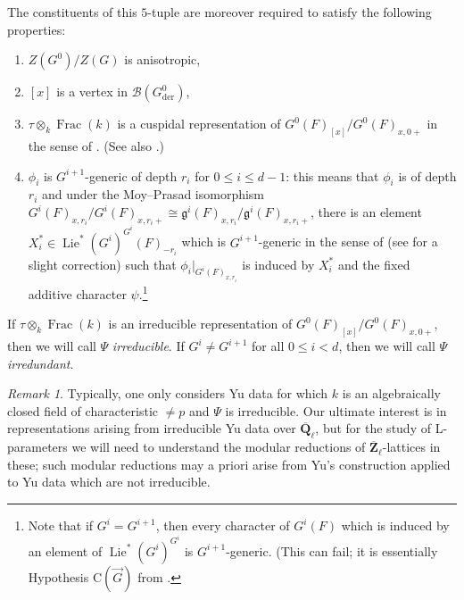 \documentclass[reqno]{amsart}
\numberwithin{equation}{subsection}
\newcommand{\F}{\mathbf{F}}
\newcommand{\Q}{\mathbf{Q}}
\newcommand{\Z}{\mathbf{Z}}
\newcommand{\ol}[1]{\overline{#1}}
\newcommand\cB{\mathcal{B}}
\newcommand\frg{\mathfrak{g}}
\DeclareMathOperator{\Lie}{Lie}
\DeclareMathOperator{\Frac}{Frac}
\DeclareMathOperator{\der}{der}
\theoremstyle{remark}
\newtheorem{remark}[thm]{Remark}
\numberwithin{equation}{subsection}
\numberwithin{figure}{subsection}
\begin{document}
The constituents of this $5$-tuple are moreover required to satisfy the following properties:
\begin{enumerate}
\item $Z(G^0)/Z(G)$ is anisotropic,
\item $[x]$ is a vertex in $\cB(G^0_{\der})$,
\item $\tau \otimes_k {\Frac(k)}$ is a cuspidal representation of $G^0(F)_{[x]}/G^0(F)_{x, 0+}$ in the sense of \cite[\S 2.10]{Cot26b}. (See also \cite[Proposition~2.1.4]{Cot26b}.)
\item $\phi_i$ is $G^{i+1}$-generic of depth $r_i$ for $0 \leq i \leq d-1$: this means that $\phi_i$ is of depth $r_i$ and under the Moy--Prasad isomorphism $G^i(F)_{x,r_i}/G^i(F)_{x,r_i+} \cong \frg^i(F)_{x,r_i}/\frg^i(F)_{x,r_i+}$, there is an element $X_i^* \in \Lie^*(G^i)^{G^i}(F)_{-r_i}$ which is $G^{i+1}$-generic in the sense of \cite[\S 8]{Yu01} (see \cite[Remark 4.1.3]{FKS23} for a slight correction) such that $\phi_i|_{G^i(F)_{x,r_i}}$ is induced by $X_i^*$ and the fixed additive character $\psi$.\footnote{Note that if $G^i = G^{i+1}$, then every character of $G^i(F)$ which is induced by an element of $\Lie^*(G^i)^{G^i}$ is $G^{i+1}$-generic. (This can fail; it is essentially Hypothesis $\mathrm{C}(\vec G)$ from \cite[\S 2.6]{HM08}.}
\end{enumerate}
If $\tau \otimes_k \Frac(k)$ is an irreducible representation of $G^0(F)_{[x]}/G^0(F)_{x,0+}$, then we will call $\Psi$ \textit{irreducible}. If $G^i \neq G^{i+1}$ for all $0\leq i<d$, then we will call $\Psi$ \textit{irredundant}.

\begin{remark}
Typically, one only considers Yu data for which $k$ is an algebraically closed field of characteristic $\neq p$ and $\Psi$ is irreducible. Our ultimate interest is in representations arising from irreducible Yu data over $\ol\Q_\ell$, but for the study of L-parameters we will need to understand the modular reductions of $\ol\Z_\ell$-lattices in these; such modular reductions may a priori arise from Yu's construction applied to Yu data which are not irreducible.%
\end{remark}
\end{document}
